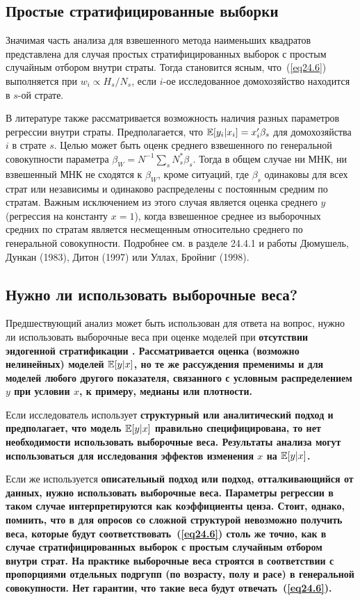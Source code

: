 \subsection*{Простые стратифицированные выборки}

Значимая часть анализа для взвешенного метода наименьших квадратов представлена для случая простых стратифицированных выборок с простым случайным отбором внутри страты. Тогда становится ясным, что~(\ref{eq24.6}) выполняется при $w_i \propto H_s / N_s$, если $i$-ое исследованное домохозяйство находится в $s$-ой страте. 

В литературе также рассматривается возможность наличия разных параметров регрессии внутри страты. Предполагается, что $\mathbb{E}[y_i | x_i]  = x'_i \beta_s$ для домохозяйства $i$ в страте $s$. Целью может быть оценк среднего взвешенного по генеральной совокупности параметра $\beta_W = N^{-1} \sum_s N^*_s \beta_s$. Тогда в общем случае ни МНК, ни взвешенный МНК не сходятся к $\beta_W$, кроме ситуаций, где $\beta_s$ одинаковы для всех страт или независимы и одинаково распределены с постоянным средним по стратам. Важным исключением из этого случая является оценка среднего $y$ (регрессия на константу $x = 1$), когда взвешенное среднее из выборочных средних по стратам является несмещенным относительно среднего по генеральной совокупности. Подробнее см. в разделе 24.4.1 и работы Дюмушель, Дункан (1983), Дитон (1997) или Уллах, Бройниг (1998). 

\subsection*{Нужно ли использовать выборочные веса?}

Предшествующий анализ может быть использован для ответа на вопрос, нужно ли использовать выборочные веса при оценке моделей при \bfseries отсутствии эндогенной стратификации \mdseries. Рассматривается оценка (возможно нелинейных) моделей $\mathbb{E}[y|x]$, но те же рассуждения пременимы и для моделей любого другого показателя, связанного с условным распределением $y$ при условии $x$, к примеру, медианы или плотности. 

Если исследователь использует \bfseries структурный \mdseries или \bfseries аналитический \mdseries подход и предполагает, что модель $\mathbb{E}[y|x]$ правильно специфицирована, то нет необходимости использовать выборочные веса. Результаты анализа могут использоваться для исследования эффектов изменения $x$ на $\mathbb{E}[y|x]$. 

Если же используется \bfseries описательный \mdseries подход или подход, отталкивающийся от данных, нужно использовать выборочные веса. Параметры регрессии в таком случае интерпретируются как коэффициенты ценза. Стоит, однако, помнить, что в для опросов со сложной структурой невозможно получить веса, которые будут соответствовать~(\ref{eq24.6}) столь же точно, как в случае стратифицированных выборок с простым случайным отбором внутри страт. На практике выборочные веса строятся в соответствии с пропорциями отдельных подргупп (по возрасту, полу и расе) в генеральной совокупности. Нет гарантии, что такие веса будут отвечать~(\ref{eq24.6}). 

